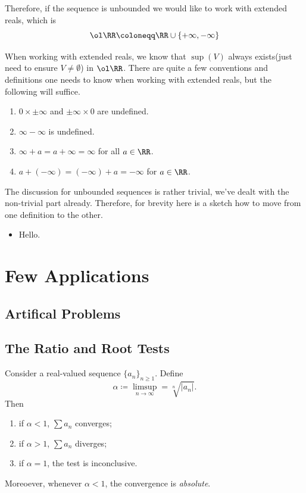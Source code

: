 \documentclass[parskip=half, numbers=endperiod, 11pt]{scrartcl}
\begin{document}
Therefore, if the sequence is unbounded we would like to
work with extended reals, which is
\[\ol\RR \coloneqq \RR \cup \{ +\infty, -\infty \} \]

When working with extended reals, we know that
$\sup(V)$ always exists(just need to ensure
$V \ne \emptyset$) in $\ol\RR$. There are quite a few
conventions and definitions one needs to know when
working with extended reals, but the following will
suffice.

\begin{enumerate}
	\item $0\times \pm\infty$ and $\pm\infty \times 0$
	      are undefined.

	\item $\infty - \infty$ is undefined.

	\item $\infty + a = a + \infty = \infty$ for all
	      $a \in \RR$.

	\item $a + (-\infty) = (-\infty) + a = -\infty$ for
	      $a \in \RR$.
\end{enumerate}

The discussion for unbounded sequences is rather trivial,
we've dealt with the non-trivial part already. Therefore,
for brevity here is a sketch how to move from one
definition to the other.

\begin{itemize}
	\item Hello.
\end{itemize}

\section{Few Applications}

\subsection{Artifical Problems}

\subsection{The Ratio and Root Tests}
\begin{theorem}
	Consider a real-valued sequence $\{a_n\}_{n \ge 1}$.
	Define
	\[\alpha \coloneqq \limsup_{n \to \infty} = \sqrt[n]{|a_n|}. \]
	Then
	\begin{enumerate}
		\item if $\alpha < 1$, $\sum a_n$ converges;
		\item if $\alpha > 1$, $\sum a_n$ diverges;
		\item if $\alpha = 1$, the test is inconclusive.
	\end{enumerate}
	Moreoever, whenever $\alpha < 1$, the convergence
	is \emph{absolute}.
\end{theorem}
\end{document}
